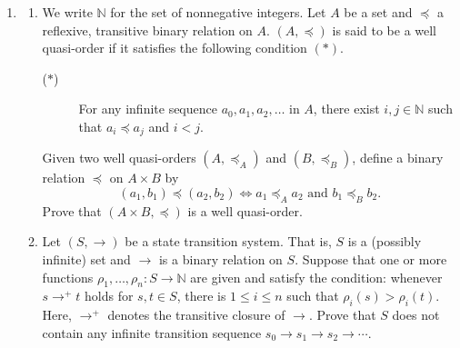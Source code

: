 \documentclass{article}
\begin{document}
\begin{enumerate}[label=\fbox{\arabic*}]
  \item \begin{enumerate}[label=(\arabic*)]
          \item We write $\mathbb{N}$ for the set of nonnegative integers. Let $A$ be a set and $\preceq$ a reflexive, transitive binary relation on $A$. $(A, \preceq)$ is said to be a well quasi-order if it satisfies the following condition $(*)$.
                \begin{description}
                  \item[($*$)] For any infinite sequence $a_0, a_1, a_2, \dots$ in $A$, there exist $i, j \in \mathbb{N}$ such that $a_i \preceq a_j$ and $i < j$.
                \end{description}
                Given two well quasi-orders $(A, \preceq_A)$ and $(B, \preceq_B)$, define a binary relation $\preceq$ on $A \times B$ by
                \[
                  (a_1, b_1) \preceq (a_2, b_2) \iff a_1 \preceq_A a_2 \text{ and } b_1 \preceq_B b_2.
                \]
                Prove that $(A \times B, \preceq)$ is a well quasi-order.
          \item Let $(S, \to)$ be a state transition system. That is, $S$ is a (possibly infinite) set and $\to$ is a binary relation on $S$. Suppose that one or more functions $\rho_1, \dots, \rho_n: S \to \mathbb{N}$ are given and satisfy the condition: whenever $s \to^+ t$ holds for $s, t \in S$, there is $1 \le i \le n$ such that $\rho_i(s) > \rho_i(t)$. Here, $\to^+$ denotes the transitive closure of $\to$.
                Prove that $S$ does not contain any infinite transition sequence $s_0 \to s_1 \to s_2 \to \cdots$.
        \end{enumerate}


\end{enumerate}
\end{document}
